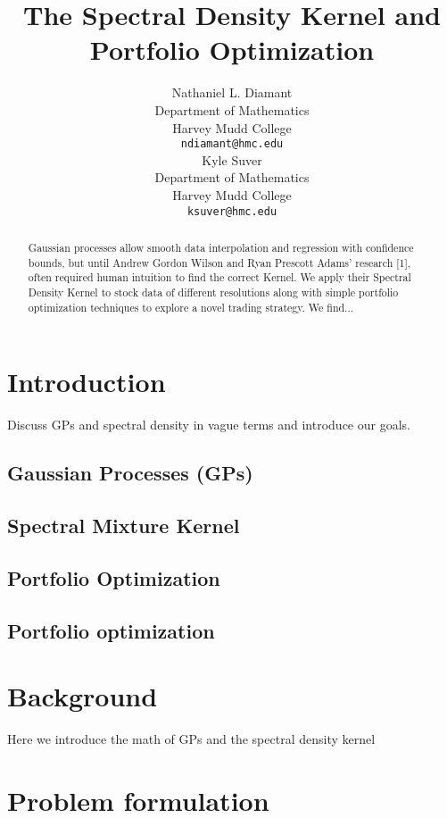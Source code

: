 \documentclass{article}
\title{The Spectral Density Kernel and Portfolio Optimization}
\author{
  Nathaniel L. Diamant \\
  Department of Mathematics\\
  Harvey Mudd College\\
  \texttt{ndiamant@hmc.edu} \\
  \And Kyle Suver \\
  Department of Mathematics\\
  Harvey Mudd College\\
  \texttt{ksuver@hmc.edu} \\
}
\begin{document}
\maketitle

\begin{abstract}
  Gaussian processes allow smooth data interpolation and regression with confidence bounds, but until Andrew Gordon Wilson and Ryan Prescott Adams' research [1], often required human intuition to find the correct Kernel. We apply their Spectral Density Kernel to stock data of different resolutions along with simple portfolio optimization techniques to explore a novel trading strategy. We find...
\end{abstract}

\section{Introduction}
\label{intro}

Discuss GPs and spectral density in vague terms and introduce our goals.

\subsection{Gaussian Processes (GPs)}

\subsection{Spectral Mixture Kernel}

\subsection{Portfolio Optimization}

\subsection{Portfolio optimization}

\section{Background}
\label{background}

Here we introduce the math of GPs and the spectral density kernel

\section{Problem formulation}
\label{problem}
\end{document}
